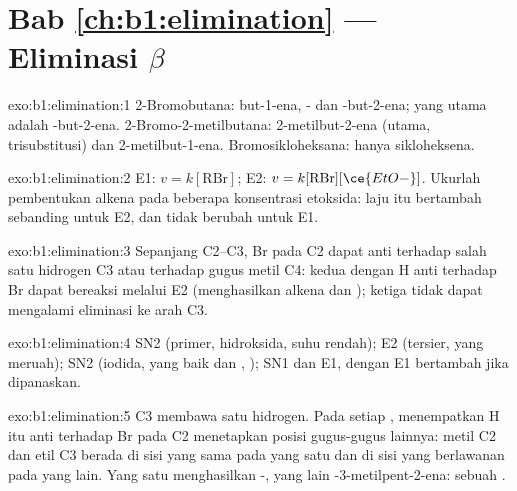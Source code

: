 \section*{Bab \ref{ch:b1:elimination} --- Eliminasi \texorpdfstring{$\beta$}{Beta}}

\begin{solution}{exo:b1:elimination:1}
2-Bromobutana: but-1-ena, - dan -but-2-ena; yang utama adalah
-but-2-ena. 2-Bromo-2-metilbutana: 2-metilbut-2-ena (utama,
trisubstitusi) dan 2-metilbut-1-ena. Bromosikloheksana: hanya
sikloheksena.
\end{solution}

\begin{solution}{exo:b1:elimination:2}
E1: $v = k[\mathrm{RBr}]$; E2: $v = k[\mathrm{RBr}][\ce{EtO-}]$. Ukurlah
 pembentukan alkena pada beberapa konsentrasi etoksida: laju itu
bertambah sebanding untuk E2, dan tidak berubah untuk E1.
\end{solution}

\begin{solution}{exo:b1:elimination:3}
Sepanjang C2--C3, Br pada C2 dapat anti terhadap salah satu hidrogen C3
atau terhadap gugus metil C4: kedua  dengan H anti terhadap Br
dapat bereaksi melalui E2 (menghasilkan alkena  dan );
 ketiga tidak dapat mengalami eliminasi ke arah C3.
\end{solution}

\begin{solution}{exo:b1:elimination:4}
SN2 (primer, hidroksida, suhu rendah); E2 (tersier,  yang
meruah); SN2 (iodida,  yang baik dan , ); SN1 dan E1, dengan E1 bertambah jika dipanaskan.
\end{solution}

\begin{solution}{exo:b1:elimination:5}
C3 membawa satu hidrogen. Pada setiap , menempatkan H itu anti
terhadap Br pada C2 menetapkan posisi gugus-gugus lainnya: metil C2 dan
etil C3 berada di sisi yang sama pada  yang satu dan di sisi
yang berlawanan pada  yang lain. Yang satu menghasilkan
-, yang lain -3-metilpent-2-ena: sebuah .
\end{solution}

